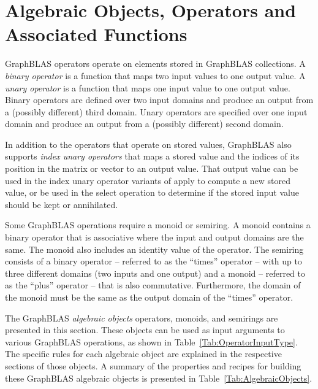 \section{Algebraic Objects, Operators and Associated Functions}

GraphBLAS operators operate on elements stored in GraphBLAS collections. A 
\emph{binary operator} is a function that maps two input values to one 
output value. A \emph{unary operator} is a function that maps one input value 
to one output value.  Binary operators are defined over two input domains
and produce an output from a (possibly different) third domain. Unary
operators are specified over one input domain and produce an output from a
(possibly different) second domain.

In addition to the operators that operate on stored values, GraphBLAS
also supports \emph{index unary operators} that maps a stored value and 
the indices of its position in the matrix or vector to an output value.
That output value can be used in the index unary operator variants of apply 
to compute a new stored value, or be used in the select operation to 
determine if the stored input value should be kept or annihilated.

Some GraphBLAS operations require a monoid or semiring.  A monoid contains a 
binary operator that is associative where the input and output domains are
the same. The monoid also includes an identity value of the operator.
The semiring consists of a binary operator -- referred to as the ``times'' 
operator -- with up to three different domains (two inputs
and one output) and a monoid -- referred to as the ``plus'' operator -- that
is also commutative.  Furthermore, the domain
of the monoid must be the same as the output domain of the ``times'' operator.

The GraphBLAS \emph{algebraic objects} operators, monoids, and semirings
are presented in this section.
These objects can be used as input arguments to various GraphBLAS
operations, as shown in Table~\ref{Tab:OperatorInputType}.
The specific rules for each algebraic object
are explained in the respective sections of those objects.  A summary
of the properties and recipes for building these GraphBLAS algebraic
objects is presented in Table~\ref{Tab:AlgebraicObjects}.

